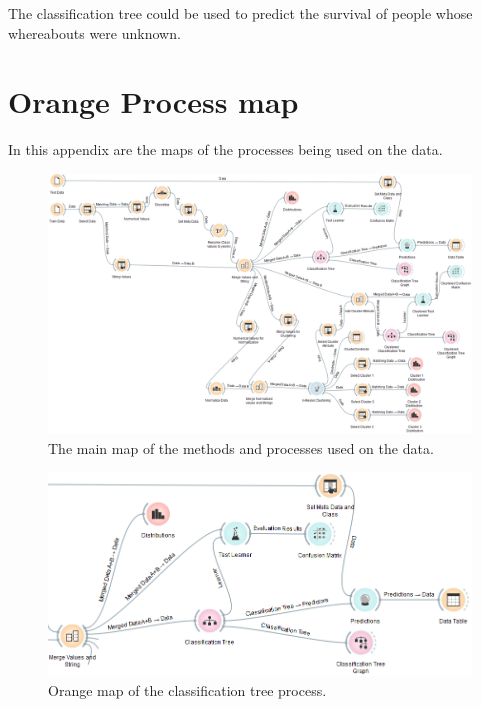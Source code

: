 \documentclass[a4paper,11pt]{article}
\begin{document}
The classification tree could be used to predict the survival of people whose whereabouts were unknown.

\clearpage
\appendix
\section{Orange Process map}
\label{appenOrange}
In this appendix are the maps of the processes being used on the data.
\begin{figure}[h]
	\centering
	\includegraphics[scale=0.35]{orangeMap}
	\caption{The main map of the methods and processes used on the data.}
	\label{OrangeMap}
\end{figure}


\begin{figure}[h]
\begin{center}
\includegraphics[scale=0.5]{ClassificationTreeOrange}
\end{center}
\caption{Orange map of the classification tree process.}
\label{classTreeMap}
\end{figure}
\end{document}
